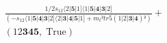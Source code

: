 \documentclass[varwidth, border=5pt]{standalone}
\begin{document}
\begin{my}
$\begin{gathered}
\scriptscriptstyle\frac{1/2s_{12}⟨2|𝟓|1]⟨1|𝟓|𝟒|𝟑|2]}{(-s_{12}⟨1|𝟓|𝟒|𝟑|2]⟨2|𝟑|𝟒|𝟓|1]+m_t²tr5(1|2|𝟑|𝟒)²)} +\\
\scriptscriptstyle(12𝟑𝟒𝟓,\;\text{True}) \phantom{+}
\end{gathered}$
\end{my}
\end{document}
